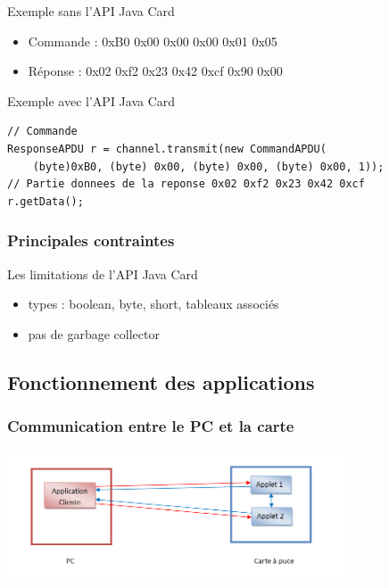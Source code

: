 \documentclass{beamer}
\begin{document}
\begin{frame}[fragile]
    \begin{exampleblock}{Exemple sans l'API Java Card}
        \begin{itemize}
            \item Commande : 0xB0 0x00 0x00 0x00 0x01 0x05
            \item Réponse : 0x02 0xf2 0x23 0x42 0xcf 0x90 0x00
        \end{itemize}
    \end{exampleblock}
    \begin{exampleblock}{Exemple avec l'API Java Card}
        \begin{lstlisting}
// Commande
ResponseAPDU r = channel.transmit(new CommandAPDU(
    (byte)0xB0, (byte) 0x00, (byte) 0x00, (byte) 0x00, 1));
// Partie donnees de la reponse 0x02 0xf2 0x23 0x42 0xcf
r.getData(); 
        \end{lstlisting}
    \end{exampleblock}
\end{frame}

\begin{frame}
    \frametitle{Principales contraintes}
    \begin{block}{Les limitations de l'API Java Card}
        \begin{itemize}
            \item types : boolean, byte, short, tableaux associés
            \item pas de \og garbage collector \fg{}
        \end{itemize}
    \end{block}
\end{frame}


\subsection{Fonctionnement des applications}
\begin{frame}
	\frametitle{Communication entre le PC et la carte}
	\includegraphics[width=10cm]{com.png}
\end{frame}
\end{document}
